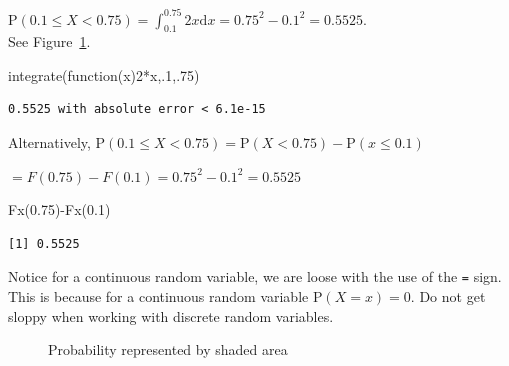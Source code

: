 \documentclass[
  letterpaper,
  DIV=11,
  numbers=noendperiod]{scrreprt}
\newenvironment{Shaded}{\begin{snugshade}}{\end{snugshade}}
\newcommand{\ControlFlowTok}[1]{\textcolor[rgb]{0.00,0.23,0.31}{#1}}
\newcommand{\DecValTok}[1]{\textcolor[rgb]{0.68,0.00,0.00}{#1}}
\newcommand{\FloatTok}[1]{\textcolor[rgb]{0.68,0.00,0.00}{#1}}
\newcommand{\FunctionTok}[1]{\textcolor[rgb]{0.28,0.35,0.67}{#1}}
\newcommand{\NormalTok}[1]{\textcolor[rgb]{0.00,0.23,0.31}{#1}}
\newcommand{\SpecialCharTok}[1]{\textcolor[rgb]{0.37,0.37,0.37}{#1}}
\begin{document}
\(\mbox{P}(0.1\leq X < 0.75) = \int_{0.1}^{0.75}2x\mbox{d}x = 0.75^2 - 0.1^2 = 0.5525\).\\
See Figure~\ref{fig-plot115}.

\begin{Shaded}
\begin{Highlighting}[]
\FunctionTok{integrate}\NormalTok{(}\ControlFlowTok{function}\NormalTok{(x)}\DecValTok{2}\SpecialCharTok{*}\NormalTok{x,.}\DecValTok{1}\NormalTok{,.}\DecValTok{75}\NormalTok{)}
\end{Highlighting}
\end{Shaded}

\begin{verbatim}
0.5525 with absolute error < 6.1e-15
\end{verbatim}

Alternatively,
\(\mbox{P}(0.1 \leq X < 0.75) = \mbox{P}(X < 0.75) -\mbox{P}(x \leq 0.1)\)

\(= F(0.75)-F(0.1)=0.75^2-0.1^2 =0.5525\)

\begin{Shaded}
\begin{Highlighting}[]
\FunctionTok{Fx}\NormalTok{(}\FloatTok{0.75}\NormalTok{)}\SpecialCharTok{{-}}\FunctionTok{Fx}\NormalTok{(}\FloatTok{0.1}\NormalTok{)}
\end{Highlighting}
\end{Shaded}

\begin{verbatim}
[1] 0.5525
\end{verbatim}

Notice for a continuous random variable, we are loose with the use of
the \texttt{=} sign. This is because for a continuous random variable
\(\mbox{P}(X=x)=0\). Do not get sloppy when working with discrete random
variables.

\begin{figure}


\caption{\label{fig-plot115}Probability represented by shaded area}

\end{figure}%
\end{document}
